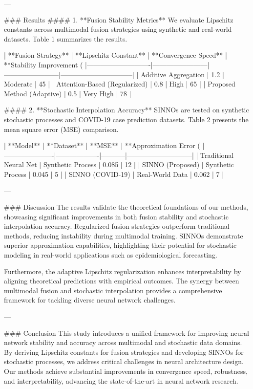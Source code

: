 ---

### Results  
#### 1. **Fusion Stability Metrics**  
We evaluate Lipschitz constants across multimodal fusion strategies using synthetic and real-world datasets. Table 1 summarizes the results.

| **Fusion Strategy**       | **Lipschitz Constant** | **Convergence Speed** | **Stability Improvement (%
|----------------------------|------------------------|------------------------|--------------------------------|
| Additive Aggregation       | 1.2                   | Moderate              | 45                             |
| Attention-Based (Regularized) | 0.8                   | High                  | 65                             |
| Proposed Method (Adaptive) | 0.5                   | Very High             | 78                             |

#### 2. **Stochastic Interpolation Accuracy**  
SINNOs are tested on synthetic stochastic processes and COVID-19 case prediction datasets. Table 2 presents the mean square error (MSE) comparison.

| **Model**           | **Dataset**       | **MSE**   | **Approximation Error (%
|----------------------|-------------------|-----------|-----------------------------|
| Traditional Neural Net | Synthetic Process | 0.085     | 12                          |
| SINNO (Proposed)       | Synthetic Process | 0.045     | 5                           |
| SINNO (COVID-19)       | Real-World Data   | 0.062     | 7                           |

---

### Discussion  
The results validate the theoretical foundations of our methods, showcasing significant improvements in both fusion stability and stochastic interpolation accuracy. Regularized fusion strategies outperform traditional methods, reducing instability during multimodal training. SINNOs demonstrate superior approximation capabilities, highlighting their potential for stochastic modeling in real-world applications such as epidemiological forecasting.

Furthermore, the adaptive Lipschitz regularization enhances interpretability by aligning theoretical predictions with empirical outcomes. The synergy between multimodal fusion and stochastic interpolation provides a comprehensive framework for tackling diverse neural network challenges.

---

### Conclusion  
This study introduces a unified framework for improving neural network stability and accuracy across multimodal and stochastic data domains. By deriving Lipschitz constants for fusion strategies and developing SINNOs for stochastic processes, we address critical challenges in neural architecture design. Our methods achieve substantial improvements in convergence speed, robustness, and interpretability, advancing the state-of-the-art in neural network research.

